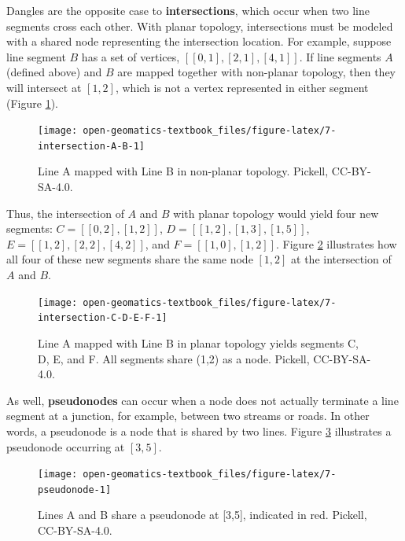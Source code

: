 \documentclass[
]{book}
\begin{document}
Dangles are the opposite case to \textbf{intersections}, which occur when two line segments cross each other. With planar topology, intersections must be modeled with a shared node representing the intersection location. For example, suppose line segment \(B\) has a set of vertices, \([[0,1],[2,1],[4,1]]\). If line segments \(A\) (defined above) and \(B\) are mapped together with non-planar topology, then they will intersect at \([1,2]\), which is not a vertex represented in either segment (Figure \ref{fig:7-intersection-A-B}).

\begin{figure}

{\centering \texttt{[image: open-geomatics-textbook\_files/figure-latex/7-intersection-A-B-1]} 

}

\caption{Line A mapped with Line B in non-planar topology. Pickell, CC-BY-SA-4.0.}\label{fig:7-intersection-A-B}
\end{figure}

Thus, the intersection of \(A\) and \(B\) with planar topology would yield four new segments: \(C=[[0,2],[1,2]]\), \(D=[[1,2],[1,3],[1,5]]\), \(E=[[1,2],[2,2],[4,2]]\), and \(F=[[1,0],[1,2]]\). Figure \ref{fig:7-intersection-C-D-E-F} illustrates how all four of these new segments share the same node \([1,2]\) at the intersection of \(A\) and \(B\).

\begin{figure}

{\centering \texttt{[image: open-geomatics-textbook\_files/figure-latex/7-intersection-C-D-E-F-1]} 

}

\caption{Line A mapped with Line B in planar topology yields segments C, D, E, and F. All segments share (1,2) as a node. Pickell, CC-BY-SA-4.0.}\label{fig:7-intersection-C-D-E-F}
\end{figure}

As well, \textbf{pseudonodes} can occur when a node does not actually terminate a line segment at a junction, for example, between two streams or roads. In other words, a pseudonode is a node that is shared by two lines. Figure \ref{fig:7-pseudonode} illustrates a pseudonode occurring at \([3,5]\).

\begin{figure}

{\centering \texttt{[image: open-geomatics-textbook\_files/figure-latex/7-pseudonode-1]} 

}

\caption{Lines A and B share a pseudonode at [3,5], indicated in red. Pickell, CC-BY-SA-4.0.}\label{fig:7-pseudonode}
\end{figure}
\end{document}

